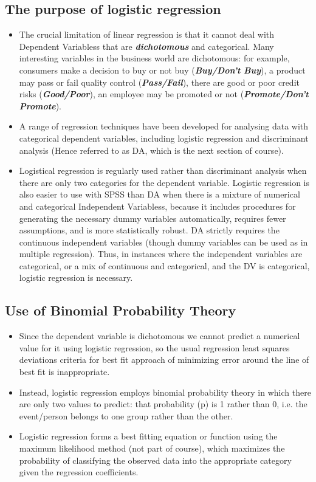 ﻿\documentclass[a4paper,12pt]{article}
\begin{document}
\subsection{The purpose of logistic regression}
\begin{itemize}
	\item The crucial limitation of linear regression is that it cannot deal with Dependent Variabless that are \textbf{\textit{dichotomous}} and categorical. Many interesting variables in the business world are dichotomous: for
	example, consumers make a decision to buy or not buy (\textit{\textbf{Buy/Don't Buy}}), a product may pass or fail quality control (\textit{\textbf{Pass/Fail}}), there are good or poor credit risks (\textit{\textbf{Good/Poor}}), an employee may be promoted or not (\textit{\textbf{Promote/Don't Promote}}).
	
	\item 	A range of regression techniques have been developed for analysing data with categorical dependent
	variables, including logistic regression and discriminant analysis (Hence referred to as DA, which is the next section of course).
	
	\item 	Logistical regression is regularly used rather than discriminant analysis when there are only two categories
	for the dependent variable. Logistic regression is also easier to use with SPSS than DA when
	there is a mixture of numerical and categorical Independent Variabless, because it includes procedures for
	generating the necessary dummy variables automatically, requires fewer assumptions, and
	is more statistically robust. DA strictly requires the continuous independent variables  (though dummy variables can be used as in multiple regression). Thus, in instances where
	the independent variables are categorical, or a mix of continuous and categorical, and the
	DV is categorical, logistic regression is necessary.
\end{itemize}


\subsection{Use of Binomial Probability Theory}
\begin{itemize}
	\item Since the dependent variable is dichotomous we cannot predict a numerical value for it
	using logistic regression, so the usual regression least squares deviations criteria for best fit
	approach of minimizing error around the line of best fit is inappropriate.
	
	\item 	Instead, logistic regression employs binomial probability theory in which there are only two values to
	predict: that probability (p) is 1 rather than 0, i.e. the event/person belongs to one group
	rather than the other.
	\item Logistic regression forms a best fitting equation or function using the
	maximum likelihood method (not part of course), which maximizes the probability of classifying the observed
	data into the appropriate category given the regression coefficients.
\end{itemize}
\end{document}

